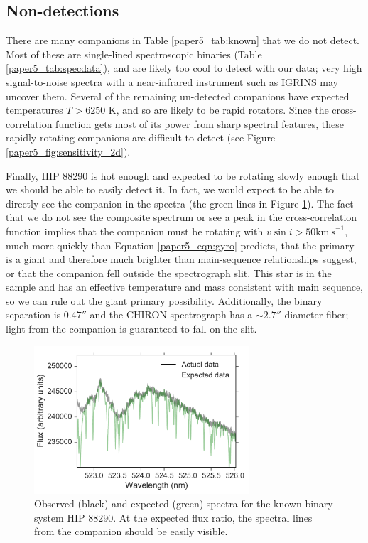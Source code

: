 \subsection{Non-detections}
\label{paper5_sec:nondetections}
There are many companions in Table \ref{paper5_tab:known} that we do not detect. Most of these are single-lined spectroscopic binaries (Table \ref{paper5_tab:specdata}), and are likely too cool to detect with our data; very high signal-to-noise spectra with a near-infrared instrument such as IGRINS may uncover them. Several of the remaining un-detected companions have expected temperatures $T  > 6250$ K, and so are likely to be rapid rotators. Since the cross-correlation function gets most of its power from  sharp spectral features, these rapidly rotating companions are difficult to detect (see Figure \ref{paper5_fig:sensitivity_2d}).  

Finally, HIP 88290 is hot enough and expected to be rotating slowly enough that we should be able to easily detect it. In fact, we would expect to be able to directly see the companion in the spectra (the green lines in Figure \ref{paper5_fig:expected}). The fact that we do not see the composite spectrum or see a peak in the cross-correlation function implies that the companion must be rotating with $v\sin{i} > 50 \mathrm{km\ s}^{-1}$, much more quickly than Equation \ref{paper5_eqn:gyro} predicts, that the primary is a giant and therefore much brighter than main-sequence relationships suggest, or that the companion fell outside the spectrograph slit. This star is in the \cite{David2015} sample and has an effective temperature and mass consistent with main sequence, so we can rule out the giant primary possibility. Additionally, the binary separation is $0.47''$ \citep{Tokovinin2015} and the CHIRON spectrograph has a $\sim 2.7''$ diameter fiber; light from the companion is guaranteed to fall on the slit.


\begin{figure}
        \centering
        \includegraphics[width= 80mm]{Figures/paper5_HIP_88290_Flux.pdf}
         \caption{Observed (black) and expected (green) spectra for the known binary system HIP 88290. At the expected flux ratio, the spectral lines from the companion should be easily visible. }
         \label{paper5_fig:expected}
\end{figure}

